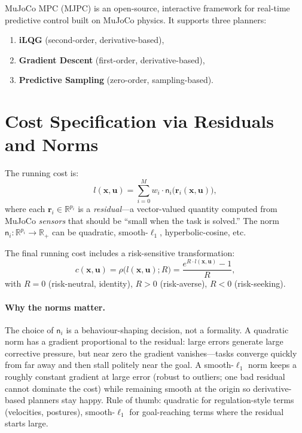 \documentclass[11pt,twoside]{report}
\theoremstyle{definition}
\theoremstyle{plain}
\theoremstyle{remark}
\newcommand{\R}{\mathbb{R}}
\newcommand{\x}{\bm{x}}
\newcommand{\uu}{\bm{u}}
\newcommand{\rr}{\bm{r}}
\newcommand{\0}{\bm{0}}
\begin{document}
MuJoCo MPC (MJPC) is an open-source, interactive framework for
real-time predictive control built on MuJoCo physics.
It supports three planners:
\begin{enumerate}
\item \textbf{iLQG} (second-order, derivative-based),
\item \textbf{Gradient Descent} (first-order, derivative-based),
\item \textbf{Predictive Sampling} (zero-order, sampling-based).
\end{enumerate}

\section{Cost Specification via Residuals and Norms}
\label{sec:mjpc-cost}

The running cost is:
\begin{equation}
l(\x,\uu)=\sum_{i=0}^{M}w_{i}\cdot\mathsf{n}_{i}\!\bigl(\rr_{i}(\x,\uu)\bigr),
\end{equation}
where each $\rr_{i}\in\R^{p_{i}}$ is a \emph{residual}---a vector-valued
quantity computed from MuJoCo \emph{sensors} that should be ``small when the
task is solved.''  The norm $\mathsf{n}_{i}:\R^{p_{i}}\to\R_{+}$ can be
quadratic, smooth-$\ell_{1}$, hyperbolic-cosine, etc.

The final running cost includes a risk-sensitive transformation:
\begin{equation}\label{eq:risk}
c(\x,\uu)=\rho\bigl(l(\x,\uu);R\bigr)=\frac{e^{R\cdot l(\x,\uu)}-1}{R},
\end{equation}
with $R=0$ (risk-neutral, identity), $R>0$ (risk-averse), $R<0$ (risk-seeking).

\paragraph{Why the norms matter.}
The choice of $\mathsf{n}_{i}$ is a behaviour-shaping decision, not a
formality. A quadratic norm has a gradient proportional to the residual:
large errors generate large corrective pressure, but near zero the
gradient vanishes---tasks converge quickly from far away and then stall
politely near the goal. A smooth-$\ell_{1}$ norm keeps a roughly
constant gradient at large error (robust to outliers; one bad residual
cannot dominate the cost) while remaining smooth at the origin so
derivative-based planners stay happy. Rule of thumb: quadratic for
regulation-style terms (velocities, postures), smooth-$\ell_{1}$ for
goal-reaching terms where the residual starts large.
\end{document}
